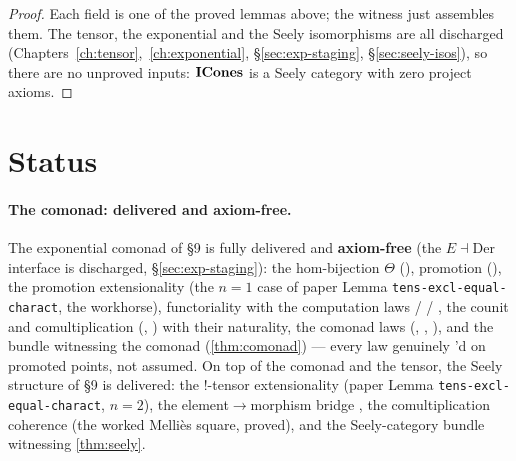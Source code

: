 \begin{proof}
Each field is one of the proved lemmas above; the witness
 just assembles them. The tensor,
the exponential and the Seely isomorphisms are all discharged
(Chapters~\ref{ch:tensor},~\ref{ch:exponential}, \S\ref{sec:exp-staging},
\S\ref{sec:seely-isos}), so there are no unproved inputs: $\mathbf{ICones}$ is a
Seely category with zero project axioms.
\end{proof}

\section{Status}\label{sec:exp-status}

\paragraph{The comonad: delivered and axiom-free.}
The exponential comonad of \S9 is fully delivered and \textbf{axiom-free}
(the $E \dashv \mathrm{Der}$ interface is discharged,
\S\ref{sec:exp-staging}): the hom-bijection $\Theta$
(), promotion (),
the promotion extensionality  (the
$n = 1$ case of paper Lemma \texttt{tens-excl-equal-charact}, the
workhorse), functoriality  with the
computation laws  /
 / ,
the counit and comultiplication (,
) with their naturality, the comonad laws
(,
,
), and the bundle
 witnessing the comonad
(\autoref{thm:comonad}) --- every law genuinely \Qed{}'d on promoted
points, not assumed. On top of the comonad and the tensor, the Seely
structure of \S9 is delivered: the $\mathord{!}$-tensor extensionality
 (paper Lemma
\texttt{tens-excl-equal-charact}, $n = 2$), the element$\to$morphism
bridge , the comultiplication
coherence  (the worked Melli\`es
square, proved), and the Seely-category bundle
 witnessing
\autoref{thm:seely}.

